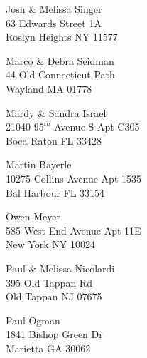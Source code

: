 \documentclass{article}
\begin{document}
\begin{center}
\begin{Huge}
\clearpage

\vspace*{\fill}
Josh \& Melissa Singer\\
63 Edwards Street 1A\\
Roslyn Heights NY 11577\\
\vspace{\fill}

\clearpage

\vspace*{\fill}
Marco \& Debra Seidman\\
44 Old Connecticut Path\\
Wayland MA 01778\\
\vspace{\fill}

\clearpage

\vspace*{\fill}
Mardy \& Sandra Israel\\
21040 $95^{th}$ Avenue S Apt C305\\
Boca Raton FL 33428\\
\vspace{\fill}

\clearpage

\vspace*{\fill}
Martin Bayerle\\
10275 Collins Avenue Apt 1535\\
Bal Harbour FL 33154\\
\vspace{\fill}

\clearpage

\vspace*{\fill}
Owen Meyer\\
585 West End Avenue Apt 11E\\
New York NY 10024\\
\vspace{\fill}

\clearpage

\vspace*{\fill}
Paul \& Melissa Nicolardi\\
395 Old Tappan Rd\\
Old Tappan NJ 07675\\
\vspace{\fill}

\clearpage

\vspace*{\fill}
Paul Ogman\\
1841 Bishop Green Dr\\
Marietta GA 30062\\
\vspace{\fill}


\end{Huge}
\end{center}
\end{document}
